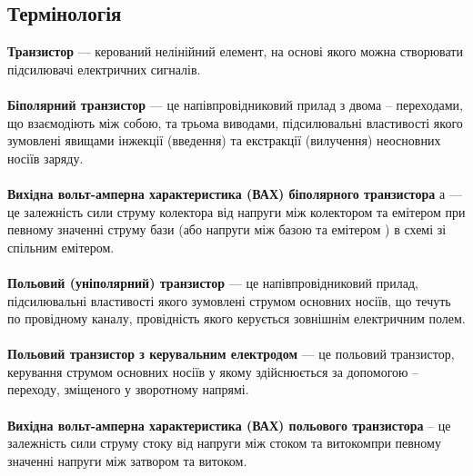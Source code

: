 \subsection{Термінологія}
\indent \textbf{Транзистор} — керований нелінійний елемент, на основі якого можна
створювати підсилювачі електричних сигналів. \\~\\
\qquad \textbf{Біполярний транзистор}  — це напівпровідниковий прилад з двома –
переходами, що взаємодіють між собою, та трьома виводами, підсилювальні
властивості якого зумовлені явищами інжекції (введення) та екстракції
(вилучення) неосновних носіїв заряду. \\~\\
\qquad \textbf{Вихідна вольт-амперна характеристика (ВАХ) біполярного
транзистора} а — це залежність сили струму колектора від напруги між
колектором та емітером при певному значенні струму бази (або
напруги між базою та емітером ) в схемі зі спільним емітером.\\~\\
\qquad \textbf{Польовий (уніполярний) транзистор} — це напівпровідниковий прилад,
підсилювальні властивості якого зумовлені струмом основних носіїв, що
течуть по провідному каналу, провідність якого керується зовнішнім
електричним полем.  \\~\\
\qquad \textbf{Польовий транзистор з керувальним електродом} — це польовий
транзистор, керування струмом основних носіїв у якому здійснюється за
допомогою –переходу, зміщеного у зворотному напрямі. \\~\\
\qquad \textbf{Вихідна вольт-амперна характеристика (ВАХ) польового транзистора} – це залежність сили струму стоку від напруги між стоком та витокомпри певному значенні напруги між затвором та витоком.\\~\\
\newpage
